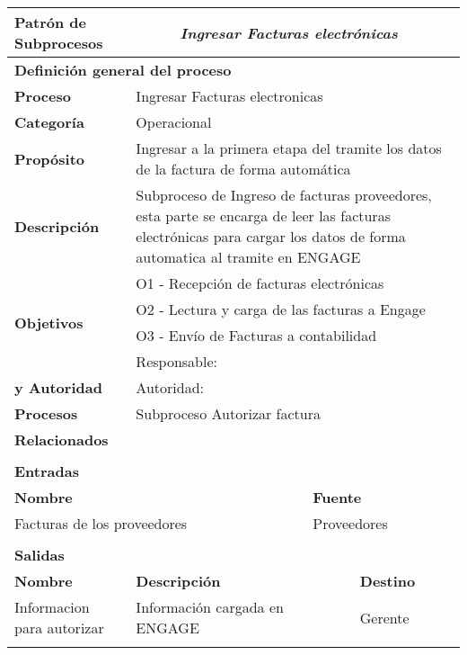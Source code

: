 \begin{longtable}{|llrrrrrr|}
	\hline
	\multicolumn{2}{|l|}{\textbf{Patrón de Subprocesos}} & \multicolumn{6}{|l|}{\textit{Ingresar Facturas electrónicas}} \\ \hline
	\multicolumn{8}{|l|}{\textbf{Definición general del proceso}} \\ \hline
	\textbf{Proceso} & \multicolumn{7}{|m{12cm}|}{Ingresar Facturas electronicas} \\ \hline
	\textbf{Categoría} & \multicolumn{7}{|m{12cm}|}{Operacional} \\ \hline
	\textbf{Propósito} & \multicolumn{7}{|m{12cm}|}{Ingresar a la primera etapa del tramite los datos de la factura de forma automática} \\ \hline
    \textbf{Descripción} & \multicolumn{7}{|m{12cm}|}{Subproceso de Ingreso de facturas proveedores, esta parte se encarga de leer las facturas electrónicas para cargar los datos de forma automatica al tramite en ENGAGE} \\ \hline
	\multirow{4}[6]{*}{\textbf{Objetivos}} 
		  & \multicolumn{7}{|l|}{O1 - Recepción de facturas electrónicas} \\ \cline{2-8}
          & \multicolumn{7}{|l|}{O2 - Lectura y carga de las facturas a Engage } \\ \cline{2-8}
          & \multicolumn{7}{|l|}{O3 - Envío de Facturas a contabilidad} \\ \hline
    \multicolumn{1}{|l|}{\textbf{Responsabilidad}} 	& \multicolumn{7}{|l|}{Responsable: } \\
	\multicolumn{1}{|l|}{\textbf{y Autoridad}} 	& \multicolumn{7}{|l|}{Autoridad: } \\ \hline
    \multicolumn{1}{|l|}{\textbf{Procesos}} 	& \multicolumn{7}{|l|}{Subproceso Autorizar factura} \\
	\multicolumn{1}{|l|}{\textbf{Relacionados}} 	&  \multicolumn{7}{|l|}{} \\ \hline
          &       &       &       &       &       &       &  \\ \hline
    \multicolumn{8}{|l|}{\textbf{Entradas}} \\ \hline
    \multicolumn{5}{|l|}{\textbf{Nombre}}   & \multicolumn{3}{|l|}{\textbf{Fuente}} \\ \hline
    \multicolumn{5}{|l|}{Facturas de los proveedores} & \multicolumn{3}{|l|}{Proveedores} \\  \hline
       &       &       &       &       &       &       &  \\ \hline
    \multicolumn{8}{|l|}{\textbf{Salidas}} \\ \hline
    \textbf{Nombre} & \multicolumn{5}{|l|}{\textbf{Descripción}} & \multicolumn{2}{|l|}{\textbf{Destino}} \\ \hline
    Informacion para autorizar & \multicolumn{5}{|l|}{Información cargada en ENGAGE} & \multicolumn{2}{|l|}{Gerente} \\ \hline
       &       &       &       &       &       &       &  \\ \hline
	

\end{longtable}
